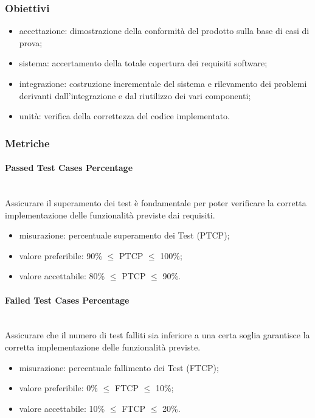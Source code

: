 \subsubsection{Obiettivi}
\begin{itemize}
	\item accettazione: dimostrazione della conformità del prodotto sulla base di casi di prova;
	\item sistema: accertamento della totale copertura dei requisiti software;
	\item integrazione: costruzione incrementale del sistema e rilevamento dei problemi derivanti dall'integrazione e dal riutilizzo dei vari componenti;
	\item unità: verifica della correttezza del codice implementato.
\end{itemize}
\subsubsection{Metriche}
\paragraph{Passed Test Cases Percentage}\mbox{}\\
Assicurare il superamento dei test è fondamentale per poter verificare la corretta implementazione delle funzionalità previste dai requisiti.
\begin{itemize}
	\item misurazione: percentuale superamento dei Test (PTCP);
	\item valore preferibile: 90\% $\leq$ PTCP $\leq$ 100\%;
	\item valore accettabile: 80\% $\leq$ PTCP $\leq$ 90\%.
\end{itemize}
\paragraph{Failed Test Cases Percentage}\mbox{}\\
Assicurare che il numero di test falliti sia inferiore a una certa soglia garantisce la corretta implementazione delle funzionalità previste.
\begin{itemize}
	\item misurazione: percentuale fallimento dei Test (FTCP);
	\item valore preferibile: 0\% $\leq$ FTCP $\leq$ 10\%;
	\item valore accettabile: 10\% $\leq$ FTCP $\leq$ 20\%.
\end{itemize}
		
\pagebreak
